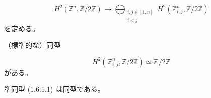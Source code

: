 \begin{equation}
  H^2(\mathbb Z^n,\mathbb Z/2\mathbb Z)
  \longrightarrow
  \bigoplus_{\substack{i,j\in[1,n]\\ i<j}}
    H^2(\mathbb Z^n_{i,j},\mathbb Z/2\mathbb Z)
  \tag{1.6.1.1}
\end{equation}
を定める。

（標準的な）同型

\begin{equation}
  H^2(\mathbb Z^n_{i,j},\mathbb Z/2\mathbb Z)
  \simeq \mathbb Z/2\mathbb Z
  \tag{1.6.1.2}
\end{equation}
がある。

準同型 (1.6.1.1) は同型である。
